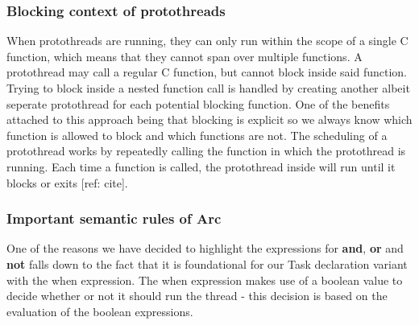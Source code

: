 

\subsubsection{Blocking context of protothreads}\label{subsubsec:blockingContextOfProtothreads}
When protothreads are running, they can only run within the scope of a single C function, which means that they cannot span over multiple functions. A protothread may call a regular C function, but cannot block inside said function. Trying to block inside a nested function call is handled by creating another albeit seperate protothread for each potential blocking function. One of the benefits attached to this approach being that blocking is explicit so we always know which function is allowed to block and which functions are not. The scheduling of a protothread works by repeatedly calling the function in which the protothread is running. Each time a function is called, the protothread inside will run until it blocks or exits [ref: cite].


\subsubsection{Important semantic rules of Arc}\label{subsubsec:importantSemanticRulesOfArc}
One of the reasons we have decided to highlight the expressions for \textbf{and}, \textbf{or} and \textbf{not} falls down to the fact that it is foundational for our Task declaration variant with the when expression. The when expression makes use of a boolean value to decide whether or not it should run the thread - this decision is based on the evaluation of the boolean expressions.

